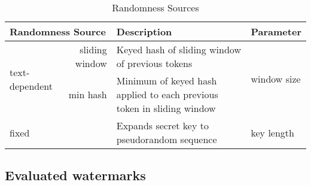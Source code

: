 \begin{table*}[!t]
    \centering
    \caption{Randomness Sources}
    \label{tab:randomness-sources}
    \begin{tabular}{|l|r|l|l|}
        \hline
        \multicolumn{2}{|l|}{\bf Randomness Source} & \textbf{Description} & \textbf{Parameter}\\
        \hline
        \hline
        \multirow{2}{*}{text-dependent} & sliding window & Keyed hash of sliding window of previous tokens & \multirow{2}{*}{window size} \\
        \cline{2-3}
        & min hash & Minimum of keyed hash applied to each previous token in sliding window & \\
        \hline
        \multicolumn{2}{|l|}{fixed} & Expands secret key to pseudorandom sequence & key length \\
        \hline
    \end{tabular}
\end{table*}


\subsection{Evaluated watermarks}
\label{ssec:watermark-design}

